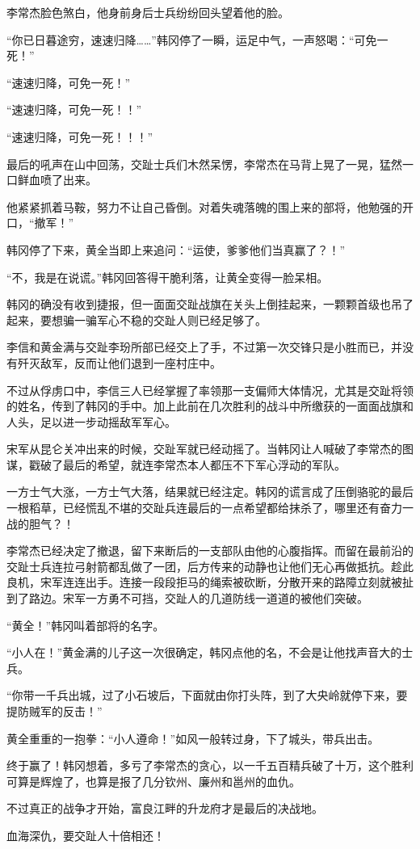李常杰脸色煞白，他身前身后士兵纷纷回头望着他的脸。

“你已日暮途穷，速速归降……”韩冈停了一瞬，运足中气，一声怒喝：“可免一死！”

“速速归降，可免一死！”

“速速归降，可免一死！！”

“速速归降，可免一死！！！”

最后的吼声在山中回荡，交趾士兵们木然呆愣，李常杰在马背上晃了一晃，猛然一口鲜血喷了出来。

他紧紧抓着马鞍，努力不让自己昏倒。对着失魂落魄的围上来的部将，他勉强的开口，“撤军！”

韩冈停了下来，黄全当即上来追问：“运使，爹爹他们当真赢了？！”

“不，我是在说谎。”韩冈回答得干脆利落，让黄全变得一脸呆相。

韩冈的确没有收到捷报，但一面面交趾战旗在关头上倒挂起来，一颗颗首级也吊了起来，要想骗一骗军心不稳的交趾人则已经足够了。

李信和黄金满与交趾李玢所部已经交上了手，不过第一次交锋只是小胜而已，并没有歼灭敌军，反而让他们退到一座村庄中。

不过从俘虏口中，李信三人已经掌握了率领那一支偏师大体情况，尤其是交趾将领的姓名，传到了韩冈的手中。加上此前在几次胜利的战斗中所缴获的一面面战旗和人头，足以进一步动摇敌军军心。

宋军从昆仑关冲出来的时候，交趾军就已经动摇了。当韩冈让人喊破了李常杰的图谋，戳破了最后的希望，就连李常杰本人都压不下军心浮动的军队。

一方士气大涨，一方士气大落，结果就已经注定。韩冈的谎言成了压倒骆驼的最后一根稻草，已经慌乱不堪的交趾兵连最后的一点希望都给抹杀了，哪里还有奋力一战的胆气？！

李常杰已经决定了撤退，留下来断后的一支部队由他的心腹指挥。而留在最前沿的交趾士兵连拉弓射箭都乱做了一团，后方传来的动静也让他们无心再做抵抗。趁此良机，宋军连连出手。连接一段段拒马的绳索被砍断，分散开来的路障立刻就被扯到了路边。宋军一方勇不可挡，交趾人的几道防线一道道的被他们突破。

“黄全！”韩冈叫着部将的名字。

“小人在！”黄金满的儿子这一次很确定，韩冈点他的名，不会是让他找声音大的士兵。

“你带一千兵出城，过了小石坡后，下面就由你打头阵，到了大央岭就停下来，要提防贼军的反击！”

黄全重重的一抱拳：“小人遵命！”如风一般转过身，下了城头，带兵出击。

终于赢了！韩冈想着，多亏了李常杰的贪心，以一千五百精兵破了十万，这个胜利可算是辉煌了，也算是报了几分钦州、廉州和邕州的血仇。

不过真正的战争才开始，富良江畔的升龙府才是最后的决战地。

血海深仇，要交趾人十倍相还！

